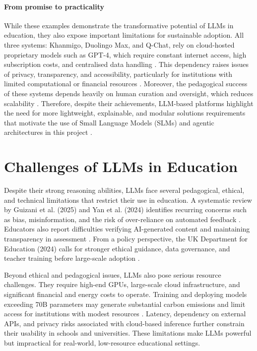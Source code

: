 \paragraph{From promise to practicality}
While these examples demonstrate the transformative potential of LLMs in education, they also expose important limitations for sustainable adoption.  
All three systems: Khanmigo, Duolingo Max, and Q-Chat, rely on cloud-hosted proprietary models such as GPT-4, which require constant internet access, high subscription costs, and centralised data handling \parencite{Khanmigo61:online, Duolingo46:online, Introduc91:online}. This dependency raises issues of privacy, transparency, and accessibility, particularly for institutions with limited computational or financial resources \parencite{Untitled13:online, ChatGPTf63:online, Practica79:online}. Moreover, the pedagogical success of these systems depends heavily on human curation and oversight, which reduces scalability \parencite{Duolingo46:online, Khanmigo61:online, ChatGPTf63:online}. Therefore, despite their achievements, LLM-based platforms highlight the need for more lightweight, explainable, and modular solutions requirements that motivate the use of Small Language Models (SLMs) and agentic architectures in this project \parencite{SmallLan73:online, LLMVsSLM66:online}.


\section{Challenges of LLMs in Education}
Despite their strong reasoning abilities, LLMs face several pedagogical, ethical, and technical limitations that restrict their use in education. A systematic review by Guizani et al. (2025) and Yan et al. (2024) identifies recurring concerns such as bias, misinformation, and the risk of over-reliance on automated feedback \parencite{Asystema7:online, Practica79:online}. Educators also report difficulties verifying AI-generated content and maintaining transparency in assessment \parencite{ChatGPTf63:online}. From a policy perspective, the UK Department for Education (2024) calls for stronger ethical guidance, data governance, and teacher training before large-scale adoption \parencite{Untitled13:online}.

Beyond ethical and pedagogical issues, LLMs also pose serious resource challenges.  
They require high-end GPUs, large-scale cloud infrastructure, and significant financial and energy costs to operate. Training and deploying models exceeding 70B parameters may generate substantial carbon emissions and limit access for institutions with modest resources \parencite{SmallLan73:online, LLMVsSLM66:online}. Latency, dependency on external APIs, and privacy risks associated with cloud-based inference further constrain their usability in schools and universities. These limitations make LLMs powerful but impractical for real-world, low-resource educational settings.

